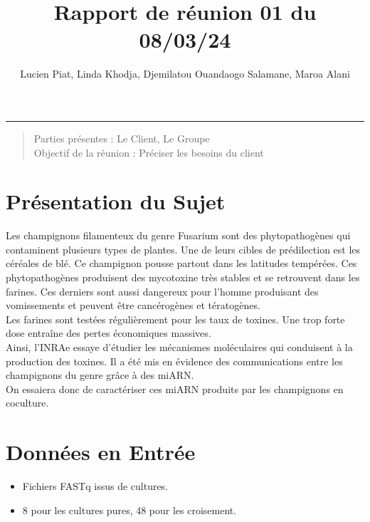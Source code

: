 \documentclass[a4paper, 11pt]{article}
\title{Rapport de réunion 01 du 08/03/24}
\author{Lucien Piat, Linda Khodja, Djemilatou Ouandaogo Salamane, Maroa Alani}
\begin{document}
\maketitle
\noindent\rule{8cm}{0.4pt}

\begin{quote}
    Parties présentes : Le Client, Le Groupe\\
    Objectif de la réunion : Préciser les besoins du client
\end{quote}

\section{Présentation du Sujet}

Les champignons filamenteux du genre Fusarium sont des phytopathogènes qui contaminent plusieurs types de plantes. 
Une de leurs cibles de prédilection est les céréales de blé. Ce champignon pousse partout dans les latitudes tempérées. 
Ces phytopathogènes produisent des mycotoxine très stables et se retrouvent dans les farines. Ces derniers sont aussi dangereux pour l'homme produisant des vomissements et peuvent être cancérogènes et tératogènes.\\

Les farines sont testées régulièrement pour les taux de toxines. Une trop forte dose entraîne des pertes économiques massives.\\

Ainsi, l'INRAe essaye d'étudier les mécanismes moléculaires qui conduisent à la production des toxines.
Il a été mis en évidence des communications entre les champignons du genre grâce à des miARN.\\

On essaiera donc de caractériser ces miARN produits par les champignons en coculture.

\section{Données en Entrée}
\begin{itemize}
    \item Fichiers FASTq issus de cultures. 
    \item 8 pour les cultures pures, 48 pour les croisement.
\end{itemize}
\end{document}
